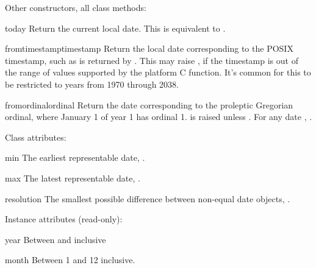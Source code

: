 Other constructors, all class methods:

\begin{methoddesc}{today}{}
    Return the current local date.  This is equivalent to
    .
\end{methoddesc}

\begin{methoddesc}{fromtimestamp}{timestamp}
    Return the local date corresponding to the POSIX timestamp, such
    as is returned by .  This may raise
    , if the timestamp is out of the range of
    values supported by the platform C 
    function.  It's common for this to be restricted to years from 1970
    through 2038.
\end{methoddesc}

\begin{methoddesc}{fromordinal}{ordinal}
    Return the date corresponding to the proleptic Gregorian ordinal,
    where January 1 of year 1 has ordinal 1.  
    is raised unless .  For any
    date , .
\end{methoddesc}

Class attributes:

\begin{memberdesc}{min}
        The earliest representable date, .
\end{memberdesc}

\begin{memberdesc}{max}
        The latest representable date, .
\end{memberdesc}

\begin{memberdesc}{resolution}
        The smallest possible difference between non-equal date
        objects, .
\end{memberdesc}

Instance attributes (read-only):

\begin{memberdesc}{year}
Between  and  inclusive
\end{memberdesc}

\begin{memberdesc}{month}
Between 1 and 12 inclusive.
\end{memberdesc}

